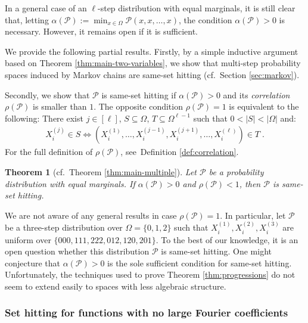 \documentclass{daj}
\newcommand{\1}{\mathbbm{1}}
\theoremstyle{plain}
\newtheorem{theorem}{Theorem}[section]
\theoremstyle{definition}
\newcommand{\cP}{\mathcal{P}}
\begin{document}
In a general case of an $\ell$-step distribution with equal marginals, it
is still clear that, letting
$\alpha(\mathcal{P}) := \min_{x\in\Omega} \cP(x,x,\ldots,x)$, the condition
$\alpha(\mathcal{P}) > 0$ is necessary. However, it remains
open if it is sufficient.

We provide the following partial results. Firstly, by a simple inductive argument
based on Theorem \ref{thm:main-two-variables}, we show that multi-step 
probability  spaces induced by Markov chains are same-set hitting
(cf.~Section \ref{sec:markov}).

Secondly, we show that $\mathcal{P}$ is same-set hitting 
if $\alpha(\mathcal{P}) > 0$ and its 
\emph{correlation} $\rho(\mathcal{P})$ is smaller than $1$. 
The opposite condition $\rho(\mathcal{P}) = 1$ is equivalent
to the following:
There exist $j \in [\ell]$, $S \subseteq \Omega$, 
$T \subseteq \Omega^{\ell-1}$ such that
$0 < |S| < |\Omega|$ and:
\begin{align*}
X_i^{(j)} \in S \iff
\left(X_i^{(1)}, \ldots, X_i^{(j-1)}, X_i^{(j+1)}, \ldots, X_i^{(\ell)}\right)
\in T \; .
\end{align*}
For the full definition of $\rho(\mathcal{P})$, see~Definition \ref{def:correlation}.

\begin{theorem}[cf.~Theorem \ref{thm:main-multiple}]
\label{thm:rho-hitting}
Let $\mathcal{P}$ be a probability distribution with equal marginals.
If $\alpha(\mathcal{P}) > 0$ and $\rho(\mathcal{P}) < 1$, then $\mathcal{P}$
is same-set hitting.
\end{theorem}

We are not aware of any general results in case $\rho(\mathcal{P}) = 1$.
In particular, let $\mathcal{P}$ be a three-step distribution over
$\Omega = \{0, 1, 2\}$ such that $X_i^{(1)},X_i^{(2)},X_i^{(3)}$ are uniform
over $\{000,111,222,012,120,201\}$. To the best of our knowledge,
it is an open question whether this distribution $\mathcal{P}$ is same-set 
hitting.
One might conjecture that $\alpha(\cP) > 0$ is the sole sufficient
condition for same-set hitting.
Unfortunately, the techniques used to prove Theorem \ref{thm:progressions}
do not seem to extend easily to spaces with less algebraic structure.

\subsubsection{Set hitting for functions  with no large Fourier coefficients}
\label{sec:intro-fourier}
\end{document}
